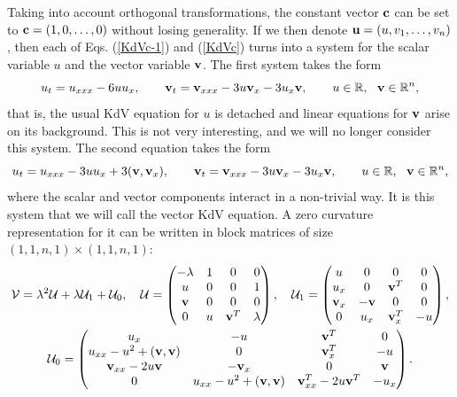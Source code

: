 \documentclass[11pt]{article}
\theoremstyle{plain}
\theoremstyle{definition}
\begin{document}
Taking into account orthogonal transformations, the constant vector ${\bf c}$ can be set to ${\bf c}=(1,0,\dots, 0)$ without losing generality. If we then denote ${\bf u}=(u,v_1,\dots,v_n)$, then each of Eqs. (\ref{KdVc-1}) and (\ref{KdVc}) turns into a system for the scalar variable $u$ and the vector variable ${\bf v}$. The first system takes the form
\[
 u_t=u_{xxx}-6uu_x,\qquad 
 {\bf v}_t={\bf v}_{xxx}-3u{\bf v}_x-3u_x{\bf v},\qquad 
 u\in{\mathbb R},~~{\bf v}\in{\mathbb R}^n,
\]
that is, the usual KdV equation for $u$ is detached and linear equations for ${\bf v}$ arise on its background. This is not very interesting, and we will no longer consider this system. The second equation takes the form
\begin{equation}\label{KdV}
 u_t=u_{xxx}-3uu_x+3({\bf v},{\bf v}_x),\qquad 
 {\bf v}_t={\bf v}_{xxx}-3u{\bf v}_x-3u_x{\bf v},\qquad 
 u\in{\mathbb R},~~{\bf v}\in{\mathbb R}^n,
\end{equation}
where the scalar and vector components interact in a non-trivial way. It is this system that we will call the vector KdV equation. A zero curvature representation for it can be written in block matrices of size $(1,1,n,1)\times(1,1,n,1)$:
\begin{equation}\label{KdV-UV}
\begin{gathered}
{\cal V}=\lambda^2{\cal U}+\lambda{\cal U}_1+{\cal U}_0,\quad
{\cal U}=\begin{pmatrix}
 -\lambda & 1 & 0 & 0 \\ 
  u & 0 & 0 & 1\\ 
  {\bf v} & 0 & 0 & 0\\ 
  0 & u & {\bf v}^T & \lambda    
 \end{pmatrix},\quad
 {\cal U}_1=\begin{pmatrix}
  u & 0 & 0 & 0 \\
  u_x & 0 & {\bf v}^T & 0 \\ 
  {\bf v}_x & -{\bf v} & 0 & 0 \\ 
  0 & u_x & {\bf v}^T_x & -u 
 \end{pmatrix},\\
 {\cal U}_0=\begin{pmatrix}
  u_x & -u & {\bf v}^T & 0\\ 
  u_{xx}-u^2+({\bf v},{\bf v}) & 0 & {\bf v}^T_x & -u\\ 
  {\bf v}_{xx}-2u{\bf v} & -{\bf v}_x & 0 & {\bf v} \\   
  0 & u_{xx}-u^2+({\bf v},{\bf v}) & {\bf v}^T_{xx}-2u{\bf v}^T & -u_x  
 \end{pmatrix}. 
\end{gathered}
\end{equation}
\end{document}

